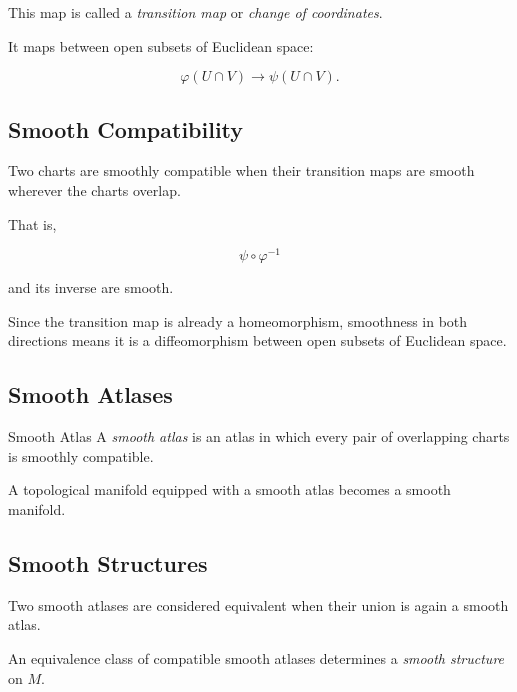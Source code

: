 This map is called a \emph{transition map} or \emph{change of coordinates}.

It maps between open subsets of Euclidean space:

\[
\varphi(U\cap V)
\longrightarrow
\psi(U\cap V).
\]

\subsection{Smooth Compatibility}
\label{subsec:smooth-compatibility-manifolds}

Two charts are smoothly compatible when their transition maps are smooth
wherever the charts overlap.

That is,

\[
\boxed{
\psi\circ\varphi^{-1}
}
\]

and its inverse are smooth.

Since the transition map is already a homeomorphism, smoothness in both
directions means it is a diffeomorphism between open subsets of Euclidean
space.

\subsection{Smooth Atlases}
\label{subsec:smooth-atlases}

\begin{definitionbox}{Smooth Atlas}
A \emph{smooth atlas} is an atlas in which every pair of overlapping charts
is smoothly compatible.
\end{definitionbox}

A topological manifold equipped with a smooth atlas becomes a smooth
manifold.

\subsection{Smooth Structures}
\label{subsec:manifold-smooth-structures}

Two smooth atlases are considered equivalent when their union is again a
smooth atlas.

An equivalence class of compatible smooth atlases determines a
\emph{smooth structure} on \(M\).

